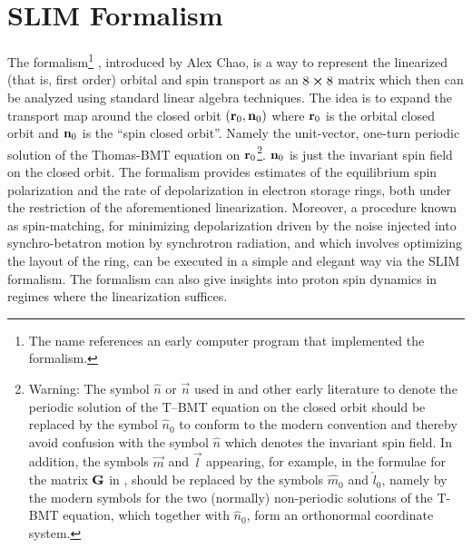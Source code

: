 


\section{SLIM Formalism}
\label{s:slim}

The  formalism\footnote
  {
The name references an early computer program that implemented the formalism.
  }
\cite{b:chao.spin,b:barber99}, introduced by Alex Chao, is a way to represent the linearized (that
is, first order) orbital and spin transport as an $8 \mathbin{\boldsymbol{\times}} 8$ matrix which then can be analyzed
using standard linear algebra techniques. The idea is to expand the transport map around the closed
orbit $({\bf r}_0, {\bf n}_0)$ where ${\bf r}_0$ is the orbital closed orbit and ${\bf n}_0$ is the ``spin
closed orbit''. Namely the unit-vector, one-turn periodic solution of the Thomas-BMT equation on
${\bf r}_0$\footnote
  {
Warning: The symbol $\hat n$ or
$\vec n$ used in \cite{b:chao.spin,b:barber85} and other early literature to denote the periodic
solution of the T--BMT equation on the closed orbit should be replaced by the symbol $\hat n_0$ to
conform to the modern convention \cite{b:barber99} and thereby avoid confusion with the symbol $\hat
n$ which denotes the invariant spin field.  In addition, the symbols $\vec m$ and $\vec l$
appearing, for example, in the formulae for the matrix ${\bf G}$ in \cite{b:barber85}, should be
replaced by the symbols $\hat m_0$ and $\hat l_0$, namely by the modern symbols for the two
(normally) non-periodic solutions of the T-BMT equation, which together with $\hat n_0$, form an
orthonormal coordinate system.
  }.
% 
${\bf n}_0$ is just the invariant spin field on the closed orbit. The formalism provides estimates of
the equilibrium spin polarization and the rate of depolarization in electron storage rings, both
under the restriction of the aforementioned linearization. Moreover, a procedure known as
spin-matching, for minimizing depolarization driven by the noise injected into synchro-betatron
motion by synchrotron radiation, and which involves optimizing the layout of the ring, can be
executed in a simple and elegant way via the SLIM formalism. The formalism can also give insights
into proton spin dynamics in regimes where the linearization suffices.

